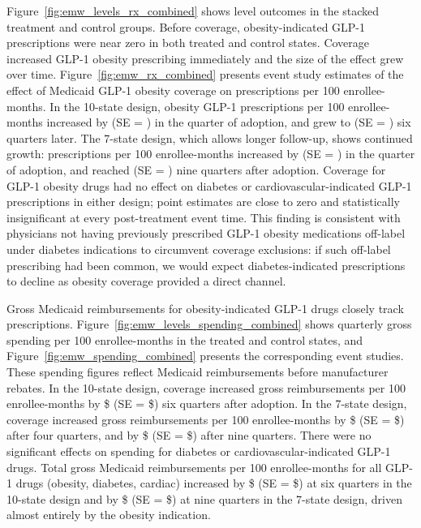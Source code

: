 Figure~\ref{fig:emw_levels_rx_combined} shows level outcomes in the stacked treatment and control groups. Before coverage, obesity-indicated GLP-1 prescriptions were near zero in both treated and control states. Coverage increased GLP-1 obesity prescribing immediately and the size of the effect grew over time. Figure~\ref{fig:emw_rx_combined} presents event study estimates of the effect of Medicaid GLP-1 obesity coverage on prescriptions per 100 enrollee-months. In the 10-state design, obesity GLP-1 prescriptions per 100 enrollee-months increased by \rxObTenZeroEmw{} (SE = \rxObTenZeroEmwSE{}) in the quarter of adoption, and grew to \rxObTenSixEmw{} (SE = \rxObTenSixEmwSE{}) six quarters later. The 7-state design, which allows longer follow-up, shows continued growth: prescriptions per 100 enrollee-months increased by \rxObSevenZeroEmw{} (SE = \rxObSevenZeroEmwSE{}) in the quarter of adoption, and reached \rxObSevenNineEmw{} (SE = \rxObSevenNineEmwSE{}) nine quarters after adoption. Coverage for GLP-1 obesity drugs had no effect on diabetes or cardiovascular-indicated GLP-1 prescriptions in either design; point estimates are close to zero and statistically insignificant at every post-treatment event time. This finding is consistent with physicians not having previously prescribed GLP-1 obesity medications off-label under diabetes indications to circumvent coverage exclusions: if such off-label prescribing had been common, we would expect diabetes-indicated prescriptions to decline as obesity coverage provided a direct channel.

Gross Medicaid reimbursements for obesity-indicated GLP-1 drugs closely track prescriptions. Figure~\ref{fig:emw_levels_spending_combined} shows quarterly gross spending per 100 enrollee-months in the treated and control states, and Figure~\ref{fig:emw_spending_combined} presents the corresponding event studies. These spending figures reflect Medicaid reimbursements before manufacturer rebates. In the 10-state design, coverage increased gross reimbursements per 100 enrollee-months by \$\spObTenSixEmw{} (SE = \$\spObTenSixEmwSE{}) six quarters after adoption. In the 7-state design, coverage increased gross reimbursements per 100 enrollee-months by \$\spObSevenFourEmw{} (SE = \$\spObSevenFourEmwSE{}) after four quarters, and by \$\spObSevenNineEmw{} (SE = \$\spObSevenNineEmwSE{}) after nine quarters. There were no significant effects on spending for diabetes or cardiovascular-indicated GLP-1 drugs. Total gross Medicaid reimbursements per 100 enrollee-months for all GLP-1 drugs (obesity, diabetes, cardiac) increased by \$\spAllTenSixEmw{} (SE = \$\spAllTenSixEmwSE{}) at six quarters in the 10-state design and by \$\spAllSevenNineEmw{} (SE = \$\spAllSevenNineEmwSE{}) at nine quarters in the 7-state design, driven almost entirely by the obesity indication.

